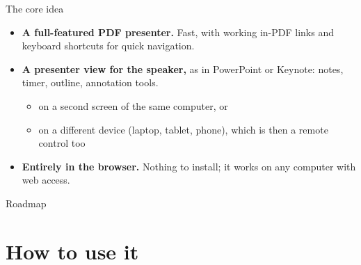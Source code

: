 \documentclass[aspectratio=169,14pt]{beamer}
\begin{document}
\begin{frame}{The core idea}
  \begin{itemize}
    \item \textbf{A full-featured PDF presenter.} Fast, with working in-PDF links and keyboard shortcuts for quick navigation.
    \item<2-> \textbf{A presenter view for the speaker,} as in PowerPoint or Keynote: notes, timer, outline, annotation tools.
      \begin{itemize}
        \item on a second screen of the same computer, or
        \item on a different device (laptop, tablet, phone), which is then a remote control too
      \end{itemize}
    \item<3-> \textbf{Entirely in the browser.} Nothing to install; it works on any computer with web access.
  \end{itemize}
\end{frame}

\begin{frame}{Roadmap}
  \tableofcontents
\end{frame}

\section{How to use it}
\end{document}
